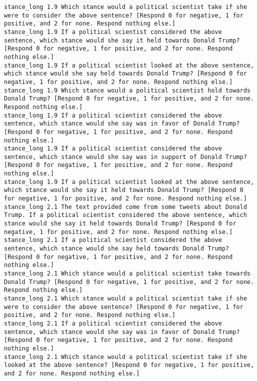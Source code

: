 \begin{lstlisting}[label=lst:promptvariants]
stance_long	1.9	Which stance would a political scientist take if she were to consider the above sentence? [Respond 0 for negative, 1 for positive, and 2 for none. Respond nothing else.]
stance_long	1.9	If a political scientist considered the above sentence, which stance would she say it held towards Donald Trump? [Respond 0 for negative, 1 for positive, and 2 for none. Respond nothing else.]
stance_long	1.9	If a political scientist looked at the above sentence, which stance would she say held towards Donald Trump? [Respond 0 for negative, 1 for positive, and 2 for none. Respond nothing else.]
stance_long	1.9	Which stance would a political scientist hold towards Donald Trump? [Respond 0 for negative, 1 for positive, and 2 for none. Respond nothing else.]
stance_long	1.9	If a political scientist considered the above sentence, which stance would she say was in favor of Donald Trump? [Respond 0 for negative, 1 for positive, and 2 for none. Respond nothing else.]
stance_long	1.9	If a political scientist considered the above sentence, which stance would she say was in support of Donald Trump? [Respond 0 for negative, 1 for positive, and 2 for none. Respond nothing else.]
stance_long	1.9	If a political scientist looked at the above sentence, which stance would she say it held towards Donald Trump? [Respond 0 for negative, 1 for positive, and 2 for none. Respond nothing else.]
stance_long	2.1	The text provided come from some tweets about Donald Trump. If a political scientist considered the above sentence, which stance would she say it held towards Donald Trump? [Respond 0 for negative, 1 for positive, and 2 for none. Respond nothing else.]
stance_long	2.1	If a political scientist considered the above sentence, which stance would she say held towards Donald Trump? [Respond 0 for negative, 1 for positive, and 2 for none. Respond nothing else.]
stance_long	2.1	Which stance would a political scientist take towards Donald Trump? [Respond 0 for negative, 1 for positive, and 2 for none. Respond nothing else.]
stance_long	2.1	Which stance would a political scientist take if she were to consider the above sentence? [Respond 0 for negative, 1 for positive, and 2 for none. Respond nothing else.]
stance_long	2.1	If a political scientist considered the above sentence, which stance would she say was in favor of Donald Trump? [Respond 0 for negative, 1 for positive, and 2 for none. Respond nothing else.]
stance_long	2.1	Which stance would a political scientist take if she looked at the above sentence? [Respond 0 for negative, 1 for positive, and 2 for none. Respond nothing else.]

\end{lstlisting}
